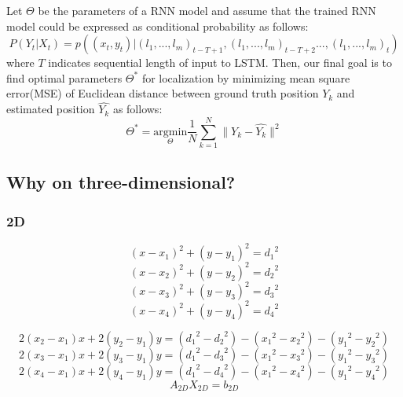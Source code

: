 \documentclass{ieeeaccess}
\begin{document}
Let $\Theta$ be the parameters of a RNN model and assume that the trained RNN model could be expressed as conditional probability as follows:
\begin{equation}
P(Y_t|X_t) = p((x_t, y_t)|(l_1,..., l_m)_{t-T+1},(l_1,..., l_m)_{t-T+2}..., (l_1,..., l_m)_t)
\end{equation}  
where $T$ indicates sequential length of input to LSTM. Then, our final goal is to find optimal parameters $\Theta^{*}$ for localization by minimizing mean square error(MSE) of Euclidean distance between ground truth position $Y_k$ and estimated position $\hat{Y_k}$ as follows:
\begin{equation}
\Theta^{*} = \underset{\Theta}{\mathrm{argmin}} \frac{1}{N} \sum_{k=1}^N \parallel Y_k - \hat{Y_k} \parallel^{2}
\end{equation}  

\subsection{Why on three-dimensional?}
\subsubsection{2D}
\begin{equation}
(x-x_1)^2+(y-y_1)^2={d_1}^2
\end{equation}
\begin{equation}
(x-x_2)^2+(y-y_2)^2={d_2}^2
\end{equation}
\begin{equation}
(x-x_3)^2+(y-y_3)^2={d_3}^2
\end{equation}
\begin{equation}
(x-x_4)^2+(y-y_4)^2={d_4}^2
\end{equation}

\begin{equation}
2(x_2-x_1)x+2(y_2-y_1)y=({d_1}^2-{d_2}^2)-({x_1}^2-{x_2}^2)-({y_1}^2-{y_2}^2)
\end{equation}
\begin{equation}
2(x_3-x_1)x+2(y_3-y_1)y=({d_1}^2-{d_3}^2)-({x_1}^2-{x_3}^2)-({y_1}^2-{y_3}^2)
\end{equation}
\begin{equation}
2(x_4-x_1)x+2(y_4-y_1)y=({d_1}^2-{d_4}^2)-({x_1}^2-{x_4}^2)-({y_1}^2-{y_4}^2)
\end{equation}
\begin{equation}
A_{2D}X_{2D}=b_{2D}
\end{equation}
\end{document}
